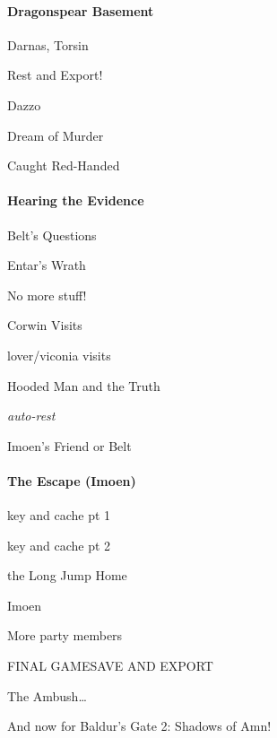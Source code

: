 \documentclass[10pt,a4,twoside]{book}
\begin{document}
\begin{multicols}{3}
\paragraph*{Dragonspear Basement}
\begin{trivlist}
\item Darnas, Torsin
\item Rest and Export!
\item Dazzo
\item Dream of Murder
\item Caught Red-Handed
\end{trivlist}

\paragraph*{Hearing the Evidence}
\begin{trivlist}
\item Belt's Questions
\item Entar's Wrath
\item No more stuff!
\item Corwin Visits
\item lover/viconia visits %
\item Hooded Man and the Truth
\item \textit{auto-rest}
\item Imoen's Friend or Belt
\end{trivlist}

\paragraph*{The Escape (Imoen)}
\begin{trivlist}
\item key and cache pt 1
\item key and cache pt 2
\item the Long Jump Home
\item Imoen
\item More party members
\item FINAL GAMESAVE AND EXPORT
\item The Ambush\ldots
\end{trivlist}
And now for Baldur's Gate 2: Shadows of Amn!
\end{multicols}
\end{document}
